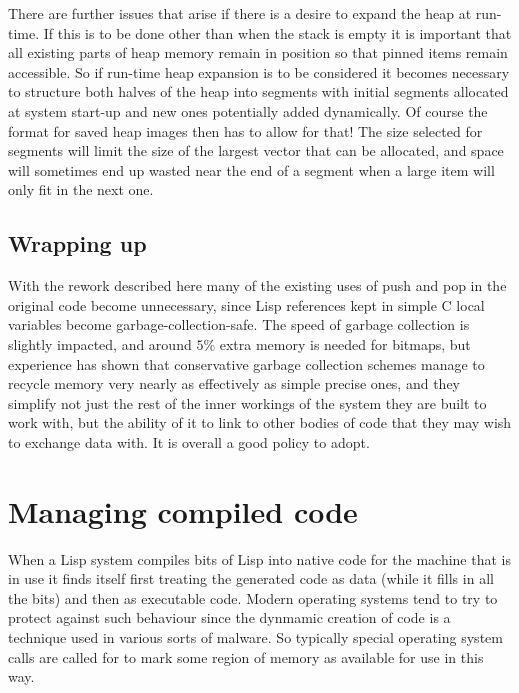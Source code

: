 There are further issues that arise if there is a desire to expand the heap
at run-time. If this is to be done other than when the stack is empty
it is important that all existing parts of heap memory remain
in position so that pinned items remain accessible. So if run-time
heap expansion is to be considered it becomes necessary to structure
both halves of the heap into segments with initial
segments allocated at system start-up and new ones potentially added
dynamically. Of course the format for saved heap images then has to
allow for that! The size selected for segments will limit the size of the
largest vector that can be allocated, and space will sometimes end up
wasted near the end of a segment when a large item will only fit in the
next one.

\subsection{Wrapping up}
With the rework described here many of the existing uses of {\tx push} and
{\tx pop} in the original code become unnecessary, since Lisp references kept
in simple C local variables become garbage-collection-safe. The speed
of garbage collection is slightly impacted, and around $5\%$ extra memory
is needed for bitmaps, but experience has shown that conservative garbage
collection schemes manage to recycle memory very nearly as effectively as
simple precise ones, and they simplify not just the rest of the inner workings
of the system they are built to work with, but the ability of it to
link to other bodies of code that they may wish to exchange data with. It is
overall a good policy to adopt. 


\section{Managing compiled code}
When a Lisp system compiles bits of Lisp into native code for the machine
that is in use it finds itself first treating the generated code as data (while
it fills in all the bits) and then as executable code. Modern operating
systems tend to try to protect against such behaviour since the dynmamic
creation of code is a technique used in various sorts of malware. So
typically special operating system calls are called for to mark some
region of memory as available for use in this way.

